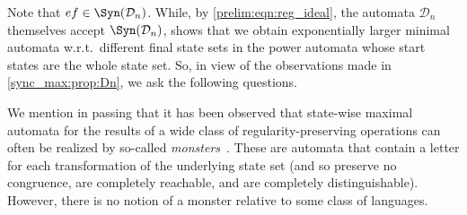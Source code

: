 Note that $ef \in \Syn(\mathcal D_n)$. While, by \cref{prelim:eqn:reg_ideal},
the automata $\mathcal D_n$ themselves accept $\Syn(\mathcal D_n)$,
 shows that we obtain exponentially larger
minimal automata w.r.t.~different final state sets in the power automata
whose start states are the whole state set.
So, in view of the observations made in \cref{sync_max:prop:Dn},
we ask the following questions.

\begin{center}
\end{center}

We mention in passing that it has been observed
that state-wise maximal automata
for the results of a wide class of regularity-preserving
operations can often be realized by so-called \emph{monsters}~\cite{DBLP:journals/dmtcs/CaronCLP20,DBLP:phd/hal/court20}. 
These are automata that contain a letter for each transformation
of the underlying state set (and so preserve no congruence, are completely reachable, and are completely distinguishable). However, there is no notion of a monster relative to some class of languages. 

